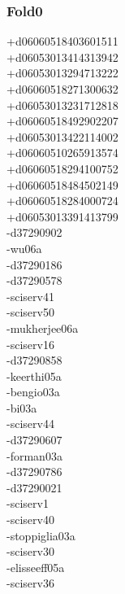 \begin{multicols}{4}
\subsubsection*{Fold0}
+d06060518403601511\\
+d06053013414313942\\
+d06053013294713222\\
+d06060518271300632\\
+d06053013231712818\\
+d06060518492902207\\
+d06053013422114002\\
+d06060510265913574\\
+d06060518294100752\\
+d06060518484502149\\
+d06060518284000724\\
+d06053013391413799\\
-d37290902\\
-wu06a\\
-d37290186\\
-d37290578\\
-sciserv41\\
-sciserv50\\
-mukherjee06a\\
-sciserv16\\
-d37290858\\
-keerthi05a\\
-bengio03a\\
-bi03a\\
-sciserv44\\
-d37290607\\
-forman03a\\
-d37290786\\
-d37290021\\
-sciserv1\\
-sciserv40\\
-stoppiglia03a\\
-sciserv30\\
-elisseeff05a\\
-sciserv36\\

\end{multicols}
